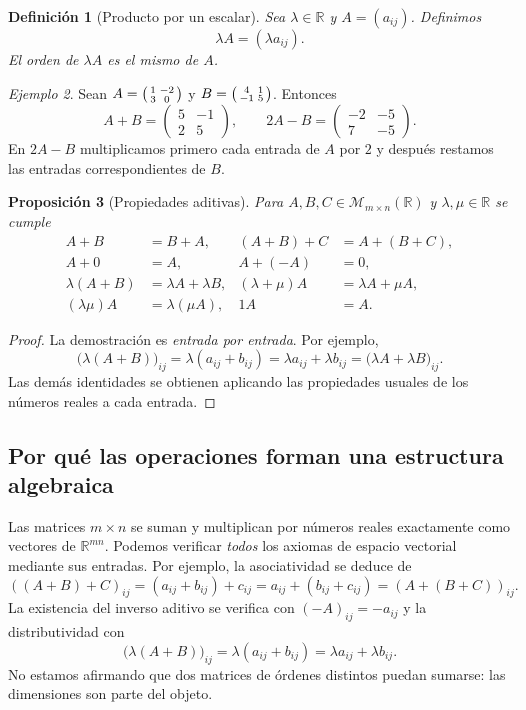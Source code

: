 \documentclass[12pt]{article}
\newtheorem{definicion}{Definición}[section]
\newtheorem{proposicion}[definicion]{Proposición}
\theoremstyle{remark}
\newtheorem{ejemplo}[definicion]{Ejemplo}
\newcommand{\R}{\mathbb{R}}
\newcommand{\Mat}[2]{\mathcal{M}_{#1\times #2}}
\begin{document}
\begin{definicion}[Producto por un escalar]
Sea $\lambda\in\R$ y $A=(a_{ij})$. Definimos
\[
\lambda A=(\lambda a_{ij}).
\]
El orden de $\lambda A$ es el mismo de $A$.
\end{definicion}

\begin{ejemplo}
Sean $A=\begin{psmallmatrix}1&-2\\3&0\end{psmallmatrix}$ y $B=\begin{psmallmatrix}4&1\\-1&5\end{psmallmatrix}$. Entonces
\[
A+B=\begin{pmatrix}5&-1\\2&5\end{pmatrix},\qquad
2A-B=\begin{pmatrix}-2&-5\\7&-5\end{pmatrix}.
\]
En $2A-B$ multiplicamos primero cada entrada de $A$ por $2$ y después restamos las entradas correspondientes de $B$.
\end{ejemplo}

\begin{proposicion}[Propiedades aditivas]
Para $A,B,C\in\Mat{m}{n}(\R)$ y $\lambda,\mu\in\R$ se cumple
\begin{align*}
A+B&=B+A,& (A+B)+C&=A+(B+C),\\
A+0&=A,& A+(-A)&=0,\\
\lambda(A+B)&=\lambda A+\lambda B,& (\lambda+\mu)A&=\lambda A+\mu A,\\
(\lambda\mu)A&=\lambda(\mu A),&1A&=A.
\end{align*}
\end{proposicion}
\begin{proof}
La demostración es \emph{entrada por entrada}. Por ejemplo,
\[
\bigl(\lambda(A+B)\bigr)_{ij}=\lambda(a_{ij}+b_{ij})
=\lambda a_{ij}+\lambda b_{ij}
=\bigl(\lambda A+\lambda B\bigr)_{ij}.
\]
Las demás identidades se obtienen aplicando las propiedades usuales de los números reales a cada entrada.
\end{proof}

\subsection{Por qué las operaciones forman una estructura algebraica}
Las matrices $m\times n$ se suman y multiplican por números reales exactamente como vectores de $\R^{mn}$. Podemos verificar \emph{todos} los axiomas de espacio vectorial mediante sus entradas. Por ejemplo, la asociatividad se deduce de
\[
((A+B)+C)_{ij}=(a_{ij}+b_{ij})+c_{ij}=a_{ij}+(b_{ij}+c_{ij})=(A+(B+C))_{ij}.
\]
La existencia del inverso aditivo se verifica con $(-A)_{ij}=-a_{ij}$ y la distributividad con
\[
\bigl(\lambda(A+B)\bigr)_{ij}=\lambda(a_{ij}+b_{ij})=\lambda a_{ij}+\lambda b_{ij}.
\]
No estamos afirmando que dos matrices de órdenes distintos puedan sumarse: las dimensiones son parte del objeto.
\end{document}
